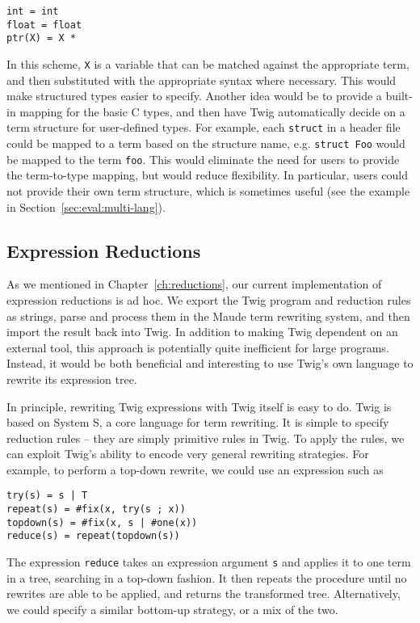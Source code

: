 \begin{verbatim}
int = int
float = float
ptr(X) = X *
\end{verbatim}

In this scheme, \texttt{X} is a variable that can be matched
against the appropriate term, and then substituted with the
appropriate syntax where necessary. This would make structured
types easier to specify. Another idea would be to provide a
built-in mapping for the basic C types, and then have Twig
automatically decide on a term structure for user-defined types.
For example, each \texttt{struct} in a header file could be mapped
to a term based on the structure name, e.g. \texttt{struct Foo}
would be mapped to the term \texttt{foo}. This would eliminate the
need for users to provide the term-to-type mapping, but would
reduce flexibility. In particular, users could not provide their
own term structure, which is sometimes useful (see the example in
Section~\ref{sec:eval:multi-lang}).

\subsection{Expression Reductions}
\label{sec:fw:twig-in-twig}

As we mentioned in Chapter~\ref{ch:reductions}, our current
implementation of expression reductions is ad hoc. We export the
Twig program and reduction rules as strings, parse and process
them in the Maude term rewriting system, and then import the
result back into Twig. In addition to making Twig dependent on an
external tool, this approach is potentially quite inefficient for
large programs. Instead, it would be both beneficial and
interesting to use Twig's own language to rewrite its expression
tree.

In principle, rewriting Twig expressions with Twig itself is easy
to do. Twig is based on System S, a core language for term
rewriting. It is simple to specify reduction rules -- they are
simply primitive rules in Twig. To apply the rules, we can exploit
Twig's ability to encode very general rewriting strategies. For
example, to perform a top-down rewrite, we could use an expression
such as

\begin{verbatim}
try(s) = s | T
repeat(s) = #fix(x, try(s ; x))
topdown(s) = #fix(x, s | #one(x))
reduce(s) = repeat(topdown(s))
\end{verbatim}

The expression \texttt{reduce} takes an expression argument
\texttt{s} and applies it to one term in a tree, searching in a
top-down fashion. It then repeats the procedure until no rewrites
are able to be applied, and returns the transformed tree.
Alternatively, we could specify a similar bottom-up strategy, or a
mix of the two.

